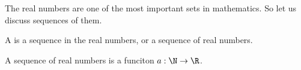 

The real numbers are
one of the most important
sets in mathematics. So let
us discuss sequences of them.


A 
is a sequence in the real
numbers, or a sequence of
real numbers.


A sequence of real
numbers is a funciton
$a: \N \to \R$.
